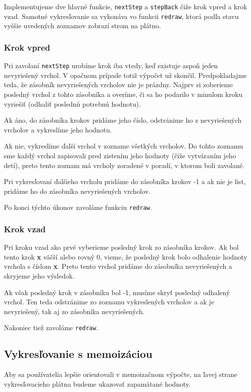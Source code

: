 Implementujeme dve hlavné funkcie, \lstinline[language=Javascript]{nextStep} a
\lstinline[language=Javascript]{stepBack} čiže krok vpred a krok vzad. Samotné
vykresľovanie sa vykonáva vo funkcii \lstinline[language=Javascript]{redraw},
ktorá podľa stavu vyššie uvedených zoznamov zobrazí strom na plátno.
\subsubsection{Krok vpred}
Pri zavolaní \lstinline[language=Javascript]{nextStep} urobíme krok iba vtedy,
keď existuje aspoň jeden nevyriešený vrchol. V opačnom prípade totiž výpočet už skončil.
Predpokladajme teda, že zásobník nevyriešených vrcholov nie je prázdny. Najprv si zoberieme
posledný vrchol z tohto zásobníka a overíme, či sa ho podarilo v minulom kroku vyriešiť (odhaliť
poslednú potrebnú hodnotu).

Ak áno, do zásobníka krokov pridáme jeho číslo, odstránime ho z nevyriešených vrcholov a
vykreslíme jeho hodnotu.

Ak nie, vykreslíme ďalší vrchol v zozname všetkých vrcholov. Do tohto zoznamu sme
každý vrchol zapisovali pred zistením jeho hodnoty (čiže vytváraním jeho detí), preto
tento zoznam má vrcholy zoradené v poradí, v ktorom boli zavolané.

Pri vykresľovaní ďalšieho vrcholu pridáme do zásobníka krokov -1 a ak nie je list,
pridáme ho do zásobníka nevyriešených vrcholov.

Po konci týchto úkonov zavoláme funkciu \lstinline[language=Javascript]{redraw}.
\subsubsection{Krok vzad}
Pri kroku vzad ako prvé vyberieme posledný krok zo zásobníka krokov. Ak bol tento
krok \textbf{x} väčší alebo rovný 0, vieme, že posledný krok bolo odhalenie hodnoty vrchola s číslom \textbf{x}.
Preto tento vrchol pridáme do zásobníka nevyriešených a skryjeme jeho výsledok.

Ak však posledný krok v zásobníku bol -1, musíme skryť posledný odhalený vrchol.
Ten teda odstránime zo zoznamu vykreslených vrcholov a ak je nevyriešený, tak aj
zo zásobníka nevyriešených.

Nakoniec tiež zavoláme \lstinline[language=Javascript]{redraw}.
\subsection{Vykresľovanie s memoizáciou}
Aby sa používatelia lepšie orientovali v memoizačnom výpočte, na ľavej strane
vykresľovacieho plátna budeme ukazovať zapamätané hodnoty.

